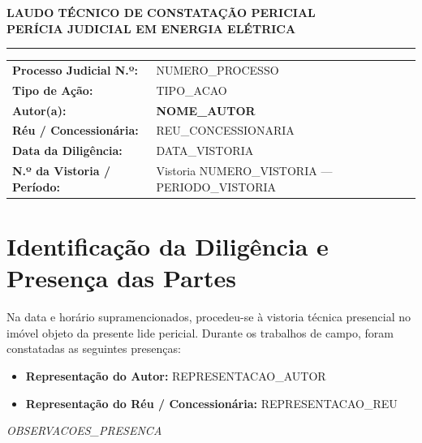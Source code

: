\documentclass[11pt,a4paper]{article}
\begin{document}
\begin{center}
    {\Large\textbf{\color{primary}LAUDO TÉCNICO DE CONSTATAÇÃO PERICIAL}}\\[4pt]
    {\normalsize\textbf{\color{accent}PERÍCIA JUDICIAL EM ENERGIA ELÉTRICA}}\\[12pt]
    \rule{\textwidth}{0.8pt}
\end{center}

\vspace{0.2cm}

\begin{table}[H]
\centering
\begin{tabularx}{\textwidth}{@{}l X@{}}
\toprule
\textbf{Processo Judicial N.º:} & {{NUMERO_PROCESSO}} \\
\textbf{Tipo de Ação:}        & {{TIPO_ACAO}} \\
\textbf{Autor(a):}            & \textbf{{{NOME_AUTOR}}} \\
\textbf{Réu / Concessionária:} & {{REU_CONCESSIONARIA}} \\
\textbf{Data da Diligência:}  & {{DATA_VISTORIA}} \\
\textbf{N.º da Vistoria / Período:} & Vistoria {{NUMERO_VISTORIA}} — {{PERIODO_VISTORIA}} \\
\bottomrule
\end{tabularx}
\end{table}

\vspace{0.4cm}

\section{Identificação da Diligência e Presença das Partes}

Na data e horário supramencionados, procedeu-se à vistoria técnica presencial no imóvel objeto da presente lide pericial. Durante os trabalhos de campo, foram constatadas as seguintes presenças:

\begin{itemize}
    \item \textbf{Representação do Autor:} {{REPRESENTACAO_AUTOR}}
    \item \textbf{Representação do Réu / Concessionária:} {{REPRESENTACAO_REU}}
\end{itemize}

\textit{{{OBSERVACOES_PRESENCA}}}
\end{document}
